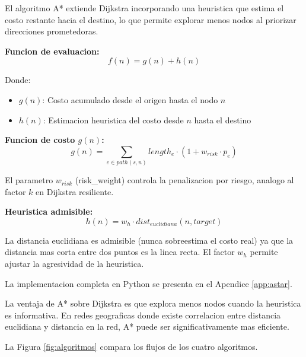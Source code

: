 \documentclass[conference]{IEEEtran}
\begin{document}
El algoritmo A* extiende Dijkstra incorporando una heuristica que estima el costo restante hacia el destino, lo que permite explorar menos nodos al priorizar direcciones prometedoras.

\textbf{Funcion de evaluacion:}
\begin{equation}
f(n) = g(n) + h(n)
\end{equation}

Donde:
\begin{itemize}
    \item $g(n)$: Costo acumulado desde el origen hasta el nodo $n$
    \item $h(n)$: Estimacion heuristica del costo desde $n$ hasta el destino
\end{itemize}

\textbf{Funcion de costo $g(n)$:}
\begin{equation}
g(n) = \sum_{e \in path(s,n)} length_e \cdot (1 + w_{risk} \cdot p_e)
\end{equation}

El parametro $w_{risk}$ (risk\_weight) controla la penalizacion por riesgo, analogo al factor $k$ en Dijkstra resiliente.

\textbf{Heuristica admisible:}
\begin{equation}
h(n) = w_h \cdot dist_{euclidiana}(n, target)
\end{equation}

La distancia euclidiana es admisible (nunca sobreestima el costo real) ya que la distancia mas corta entre dos puntos es la linea recta. El factor $w_h$ permite ajustar la agresividad de la heuristica.

La implementacion completa en Python se presenta en el Apendice \ref{app:astar}.

La ventaja de A* sobre Dijkstra es que explora menos nodos cuando la heuristica es informativa. En redes geograficas donde existe correlacion entre distancia euclidiana y distancia en la red, A* puede ser significativamente mas eficiente.

La Figura \ref{fig:algoritmos} compara los flujos de los cuatro algoritmos.
\end{document}
